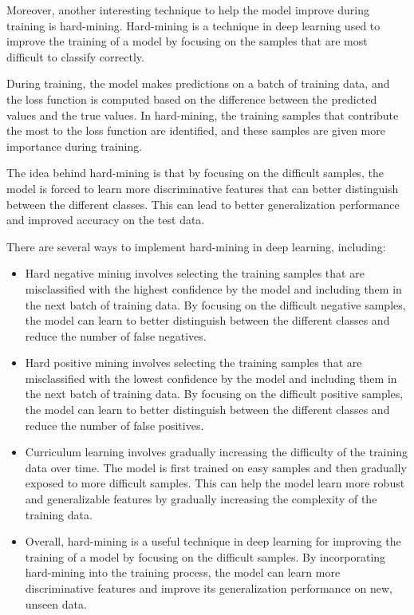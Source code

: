 Moreover, another interesting technique to help the model improve during training is hard-mining. Hard-mining is a technique in deep learning used to improve the training of a model by focusing on the samples that are most difficult to classify correctly.

During training, the model makes predictions on a batch of training data, and the loss function is computed based on the difference between the predicted values and the true values. In hard-mining, the training samples that contribute the most to the loss function are identified, and these samples are given more importance during training.

The idea behind hard-mining is that by focusing on the difficult samples, the model is forced to learn more discriminative features that can better distinguish between the different classes. This can lead to better generalization performance and improved accuracy on the test data.

There are several ways to implement hard-mining in deep learning, including:

\begin{itemize}
	\item Hard negative mining involves selecting the training samples that are misclassified with the highest confidence by the model and including them in the next batch of training data. By focusing on the difficult negative samples, the model can learn to better distinguish between the different classes and reduce the number of false negatives.
	
	\item Hard positive mining involves selecting the training samples that are misclassified with the lowest confidence by the model and including them in the next batch of training data. By focusing on the difficult positive samples, the model can learn to better distinguish between the different classes and reduce the number of false positives.
	
	\item Curriculum learning involves gradually increasing the difficulty of the training data over time. The model is first trained on easy samples and then gradually exposed to more difficult samples. This can help the model learn more robust and generalizable features by gradually increasing the complexity of the training data.
	
	\item Overall, hard-mining is a useful technique in deep learning for improving the training of a model by focusing on the difficult samples. By incorporating hard-mining into the training process, the model can learn more discriminative features and improve its generalization performance on new, unseen data.
\end{itemize}

